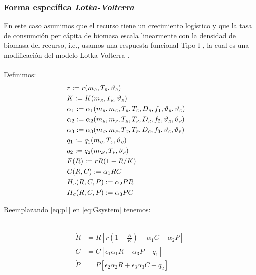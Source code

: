\subsubsection{Forma espec\'ifica  \emph{Lotka-Volterra}}
En este caso asumimos que el recurso tiene un crecimiento log\'istico y que la tasa de consumci\'on per c\'apita de biomasa escala linearmente con la densidad de biomasa del recurso, i.e., usamos una respuesta funcional Tipo I \citep{gotelliprimer}, la cual es una modificaci\'on del modelo Lotka-Volterra \citep{gotelliprimer}.\\
\mbox{}\\
Definimos:
\begin{equation}\label{eq:p1}
\begin{aligned}
&r := r(m_\R,T_\R,\vartheta_\R)&\\ 
&K := K(m_\R,T_\R,\vartheta_\R)&\\
&\alpha_{1} := \alpha_{1}(m_\R,m_\C,T_\R,T_\C,D_\R,f_1,\vartheta_\R,\vartheta_\C)&\\
&\alpha_{2} := \alpha_{2}(m_\R,m_\PP,T_\R,T_\PP,D_\R,f_2,\vartheta_\R,\vartheta_\PP)&\\
&\alpha_{3} := \alpha_{3}(m_\C,m_\PP,T_\C,T_\PP,D_\C,f_3,\vartheta_\C,\vartheta_\PP)& \\
&q_1 := q_1(m_\C,T_\C,\vartheta_\C)& \\ 
&q_2 := q_2(m_\P,T_\PP,\vartheta_\PP)&\\
&F(R):= rR(1-R/K)& \\
&G(R,C):= \alpha_1 RC &\\ 
&H_{\R}(R,C,P):= \alpha_2PR&\\
&H_{\C}(R,C,P):= \alpha_3PC&
\end{aligned}
\end{equation}

Reemplazando \eqref{eq:p1} en \eqref{eq:Gsystem} tenemos:

\
\begin{equation}
\begin{aligned} 
\dot{R} &= R\left[ r(1-\frac{R}{K})- \alpha_1 C -\alpha_2 P \right] \\
\dot{C} &= C \left[ \epsilon_1 \alpha_1 R - \alpha_3  P - q_1 \right] \\
\dot{P} &= P \left[ \epsilon_2 \alpha_2 R + \epsilon_3 \alpha_3 C - q_2 \right]
\end{aligned}
\end{equation}

